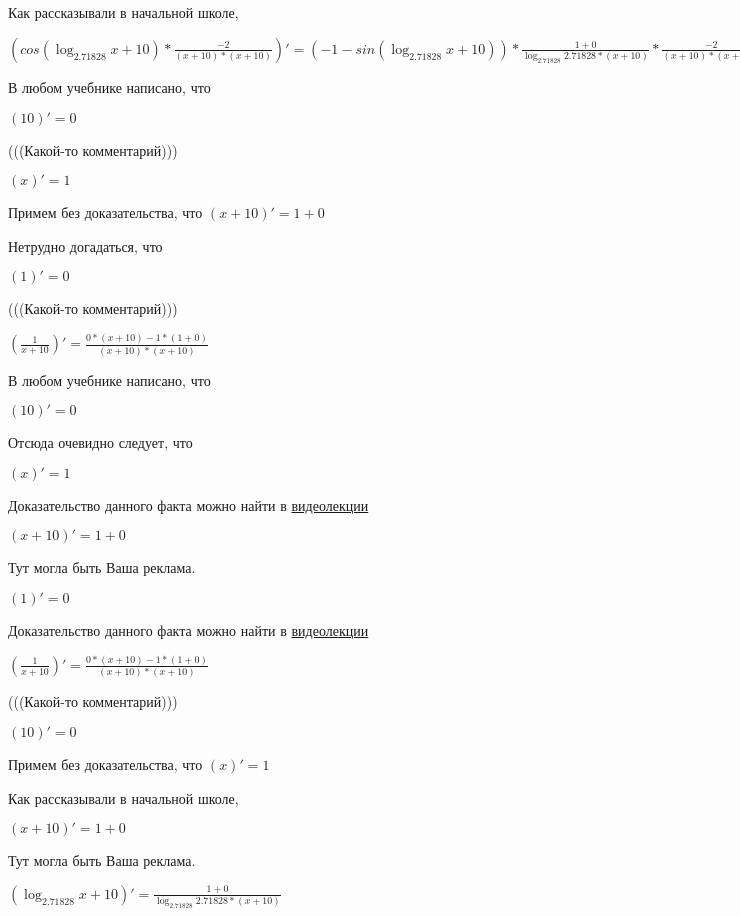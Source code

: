 \documentclass[12pt,a4paper,fleqn]{article}
\theoremstyle{definition}
\begin{document}
Как рассказывали в начальной школе,

$(cos(\log_{ 2.71828 }{ x  +  10 }) * \frac{ -2 }{( x  +  10 ) * ( x  +  10 )}
)' = ( -1  - sin(\log_{ 2.71828 }{ x  +  10 })) * \frac{ 1  +  0 }{\log_{ 2.71828 }{ 2.71828 } * ( x  +  10 )}
 * \frac{ -2 }{( x  +  10 ) * ( x  +  10 )}
 + cos(\log_{ 2.71828 }{ x  +  10 }) * \frac{ 0  * ( x  +  10 ) * ( x  +  10 ) -  -2  * (( 1  +  0 ) * ( x  +  10 ) + ( x  +  10 ) * ( 1  +  0 ))}{( x  +  10 ) * ( x  +  10 ) * ( x  +  10 ) * ( x  +  10 )}
$

В любом учебнике написано, что

$( 10 )' =  0 $

(((Какой-то комментарий)))

$( x )' =  1 $

Примем без доказательства, что
$( x  +  10 )' =  1  +  0 $

Нетрудно догадаться, что

$( 1 )' =  0 $

(((Какой-то комментарий)))

$(\frac{ 1 }{ x  +  10 }
)' = \frac{ 0  * ( x  +  10 ) -  1  * ( 1  +  0 )}{( x  +  10 ) * ( x  +  10 )}
$

В любом учебнике написано, что

$( 10 )' =  0 $

Отсюда очевидно следует, что

$( x )' =  1 $

Доказательство данного факта можно найти в \href{https://www.youtube.com/watch?v=dQw4w9WgXcQ}{видеолекции}

$( x  +  10 )' =  1  +  0 $

Тут могла быть Ваша реклама.

$( 1 )' =  0 $

Доказательство данного факта можно найти в \href{https://www.youtube.com/watch?v=dQw4w9WgXcQ}{видеолекции}

$(\frac{ 1 }{ x  +  10 }
)' = \frac{ 0  * ( x  +  10 ) -  1  * ( 1  +  0 )}{( x  +  10 ) * ( x  +  10 )}
$

(((Какой-то комментарий)))

$( 10 )' =  0 $

Примем без доказательства, что
$( x )' =  1 $

Как рассказывали в начальной школе,

$( x  +  10 )' =  1  +  0 $

Тут могла быть Ваша реклама.

$(\log_{ 2.71828 }{ x  +  10 })' = \frac{ 1  +  0 }{\log_{ 2.71828 }{ 2.71828 } * ( x  +  10 )}
$
\end{document}
